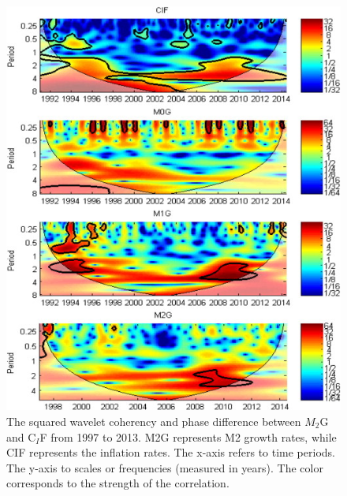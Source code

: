 \documentclass[a4paper,fleqn]{cas-sc}
\begin{document}
\begin{figure}[h]\label{fig:2}
    \centering
    \includegraphics[]{image/2.jpg}
    \caption{The squared wavelet coherency and phase difference between $M_2$G and C$_I$F from 1997 to 2013. M2G represents M2 growth rates, while CIF represents the inflation rates. The x-axis refers to time periods. The y-axis to scales or frequencies (measured in years). The color corresponds to the strength of the correlation.}
\end{figure}
\end{document}
